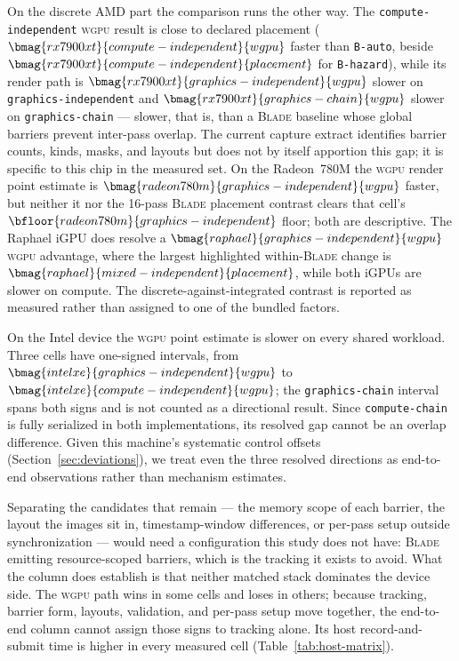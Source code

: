 \documentclass[10pt,twocolumn]{article}
\newcommand{\blade}{\textsc{Blade}}
\newcommand{\wgpu}{\textsc{wgpu}}
\begin{document}
On the discrete AMD part the comparison runs the other way. The
\texttt{compute-independent} \wgpu{} result is close to declared placement
($\bmag{rx7900xt}{compute-independent}{wgpu}$ faster than \texttt{B-auto},
beside $\bmag{rx7900xt}{compute-independent}{placement}$ for
\texttt{B-hazard}), while its render path is
$\bmag{rx7900xt}{graphics-independent}{wgpu}$ slower on
\texttt{graphics-independent} and $\bmag{rx7900xt}{graphics-chain}{wgpu}$
slower on \texttt{graphics-chain} --- slower, that is, than a \blade{}
baseline whose global barriers prevent inter-pass overlap. The current capture
extract identifies barrier counts, kinds, masks, and layouts but does not by
itself apportion this gap; it is specific to this chip in the measured set.
On the Radeon~780M the \wgpu{} render point estimate is
$\bmag{radeon780m}{graphics-independent}{wgpu}$ faster, but neither it nor the
16-pass \blade{} placement contrast clears that cell's
$\bfloor{radeon780m}{graphics-independent}$ floor; both are descriptive. The
Raphael iGPU does resolve a $\bmag{raphael}{graphics-independent}{wgpu}$
\wgpu{} advantage, where the largest highlighted within-\blade{} change is
$\bmag{raphael}{mixed-independent}{placement}$, while both iGPUs are slower on
compute. The discrete-against-integrated contrast is reported as measured
rather than assigned to one of the bundled factors.

On the Intel device the \wgpu{} point estimate is slower on every shared
workload. Three cells have one-signed intervals, from
$\bmag{intelxe}{graphics-independent}{wgpu}$ to
$\bmag{intelxe}{compute-independent}{wgpu}$; the
\texttt{graphics-chain} interval spans both signs and is not counted as a
directional result. Since \texttt{compute-chain} is fully serialized in both
implementations, its resolved gap cannot be an overlap difference. Given this
machine's systematic control offsets (Section~\ref{sec:deviations}), we treat
even the three resolved directions as end-to-end observations rather than
mechanism estimates.

Separating the candidates that remain --- the memory scope of each barrier,
the layout the images sit in, timestamp-window differences, or per-pass setup outside synchronization ---
would need a configuration this study does not have: \blade{} emitting
resource-scoped barriers, which is the tracking it exists to avoid. What the
column does establish is that neither matched stack dominates the device side.
The \wgpu{} path wins in some cells and loses in others; because tracking,
barrier form, layouts, validation, and per-pass setup move together, the
end-to-end column cannot assign those signs to tracking alone. Its host
record-and-submit time is higher in every measured cell
(Table~\ref{tab:host-matrix}).
\end{document}
